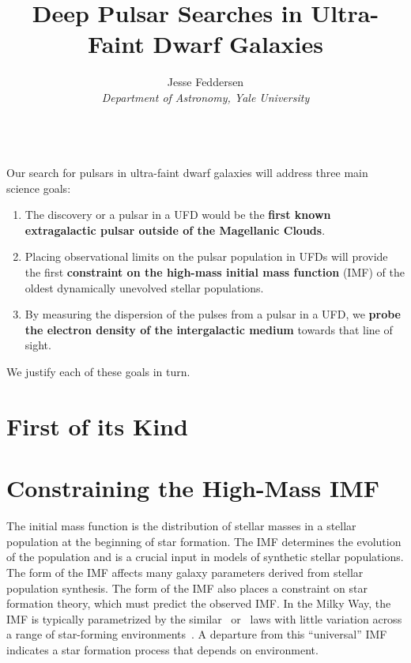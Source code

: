 \documentclass[preprint]{/Users/jesse/tex/aastex_JRF}
\begin{document}
\title{Deep Pulsar Searches in Ultra-Faint Dwarf Galaxies}
\author{Jesse Feddersen\\ \emph{Department of Astronomy, Yale University}\\~\\}

\maketitle 

%
Our search for pulsars in ultra-faint dwarf galaxies will address three main science goals:
\begin{enumerate}
\item The discovery or a pulsar in a UFD would be the \textbf{first known extragalactic pulsar outside of the Magellanic Clouds}.
\item Placing observational limits on the pulsar population in UFDs will provide the first \textbf{constraint on the high-mass initial mass function} (IMF) of the oldest dynamically unevolved stellar populations.
\item By measuring the dispersion of the pulses from a pulsar in a UFD, we \textbf{probe the electron density of the intergalactic medium} towards that line of sight.
\end{enumerate}
We justify each of these goals in turn.

\section{First of its Kind}


\section{Constraining the High-Mass IMF}
The initial mass function is the distribution of stellar masses in a stellar population at the beginning of star formation. The IMF determines the evolution of the population and is a crucial input in models of synthetic stellar populations. The form of the IMF affects many galaxy parameters derived from stellar population synthesis. The form of the IMF also places a constraint on star formation theory, which must predict the observed IMF. In the Milky Way, the IMF is typically parametrized by the similar~\citet{Kroupa01} or~\citet{Chabrier03} laws with little variation across a range of star-forming environments~\citep{Bastian10}. A departure from this ``universal'' IMF indicates  a star formation process that depends on environment.
\end{document}

